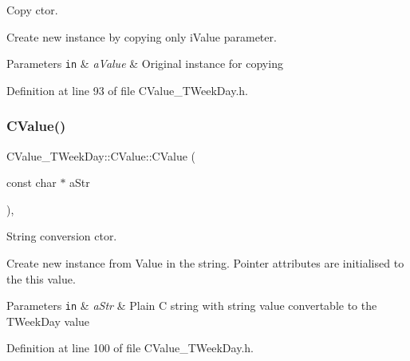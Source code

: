 Copy c\textquotesingle{}tor. 

Create new instance by copying only {\ttfamily i\+Value} parameter. 
\begin{DoxyParams}[1]{Parameters}
\mbox{\tt in}  & {\em a\+Value} & Original instance for copying \\
\hline
\end{DoxyParams}


Definition at line 93 of file C\+Value\+\_\+\+T\+Week\+Day.\+h.

\mbox{\label{class_c_value___t_week_day_1_1_c_value_a5f425476b8d7006138a270ba55c210b1}} 
\subsubsection{\texorpdfstring{C\+Value()}{CValue()}\hspace{0.1cm}{\footnotesize\ttfamily [4/4]}}
{\footnotesize\ttfamily C\+Value\+\_\+\+T\+Week\+Day\+::\+C\+Value\+::\+C\+Value (\begin{DoxyParamCaption}\item[{const char $\ast$}]{a\+Str }\end{DoxyParamCaption})\hspace{0.3cm}{\ttfamily [inline]}, {\ttfamily [explicit]}}



String conversion c\textquotesingle{}tor. 

Create new instance from Value in the string. Pointer attributes are initialised to the {\ttfamily this} value. 
\begin{DoxyParams}[1]{Parameters}
\mbox{\tt in}  & {\em a\+Str} & Plain C string with string value convertable to the T\+Week\+Day value \\
\hline
\end{DoxyParams}


Definition at line 100 of file C\+Value\+\_\+\+T\+Week\+Day.\+h.

\mbox{\label{class_c_value___t_week_day_1_1_c_value_a2b588e6afc0801080a7c23291de5d964}} 
